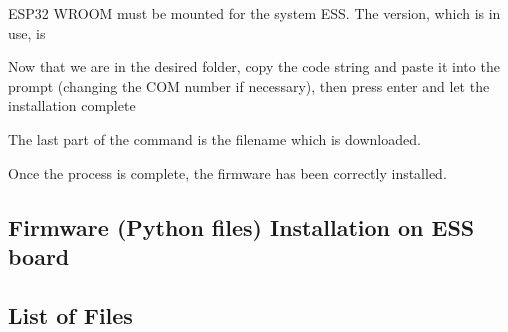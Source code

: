         ESP32 WROOM must be mounted for the system ESS. The version, which is in use, is 
        
        \medskip
   


         \medskip
         
\bigskip

Now that we are in the desired folder, copy the code string and paste it into the prompt  (changing the COM number if necessary), then press enter and let the installation complete

\medskip


\medskip
         
The last part of the command is the filename which is downloaded.

Once the process is complete, the firmware has been correctly installed.
         

\subsection{Firmware (Python files) Installation on ESS board}

\subsection{List of Files}


